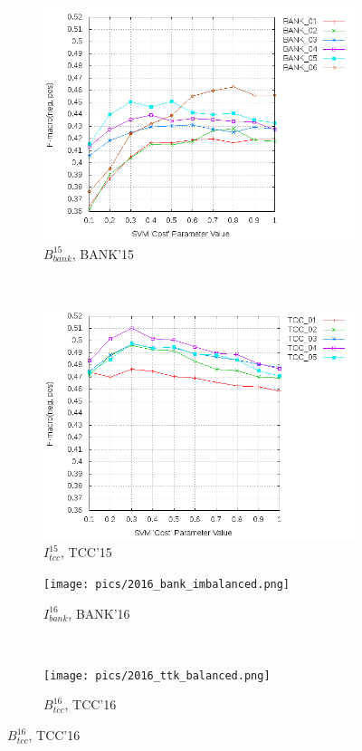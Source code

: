 \begin{figure}[!htp] \centering
    \begin{subfigure}[b]{0.48\textwidth}
        \includegraphics[width=\textwidth]{pics/2015_bank_balanced.png}
        \caption{$B_{bank}^{15}$, BANK'15}
        \label{fig:bank_cost_changes_2015}
    \end{subfigure}
    ~
    \begin{subfigure}[b]{0.48\textwidth}
        \includegraphics[width=\textwidth]{pics/2015_ttk_balanced.png}
        \caption{$I_{tcc}^{15}$, TCC'15}
        \label{fig:tcc_cost_changes_2015}
    \end{subfigure}

    \begin{subfigure}[b]{0.48\textwidth}
        \texttt{[image: pics/2016\_bank\_imbalanced.png]}
        \caption{$I_{bank}^{16}$, BANK'16}
        \label{fig:bank_cost_changes_2016}
    \end{subfigure}
    ~
    \begin{subfigure}[b]{0.48\textwidth}
        \texttt{[image: pics/2016\_ttk\_balanced.png]}
        \caption{$B_{tcc}^{16}$, TCC'16}
        \label{fig:tcc_cost_changes_2016}
    \end{subfigure}


\end{figure}
